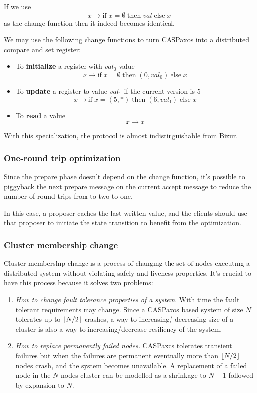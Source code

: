 \documentclass[12pt]{article}
\theoremstyle{definition}
\DeclarePairedDelimiter{\floor}{\lfloor}{\rfloor}
\begin{document}
If we use
$$x \to \mbox{if}\; x = \emptyset \;\mbox{then}\; val\; \mbox{else}\; x$$
as the change function then it indeed becomes identical.

We may use the following change functions to turn CASPaxos into a distributed compare and set register:
\begin{itemize}
  \item To {\bf initialize} a register with $val_0$ value
  $$x \to \mbox{if}\; x = \emptyset \;\mbox{then}\; (0, val_0)\; \mbox{else}\; x$$
  
  \item To {\bf update} a register to value $val_1$ if the current version is $5$
  $$x \to \mbox{if}\; x = (5, \ast) \;\mbox{then}\; (6, val_1)\; \mbox{else}\; x$$
  
  \item To {\bf read} a value
  $$x \to x$$
\end{itemize}

With this specialization, the protocol is almost indistinguishable from Bizur\cite{bizur}.

\subsubsection{One-round trip optimization}

Since the prepare phase doesn't depend on the change function, it's possible to piggyback the next prepare message on the current accept message to reduce the number of round trips from to two to one.

In this case, a proposer caches the last written value, and the clients should use that proposer to initiate the state transition to benefit from the optimization.

\subsubsection{Cluster membership change}

Cluster membership change is a process of changing the set of nodes executing a distributed system without violating safely and liveness properties. It's crucial to have this process because it solves two problems:

\begin{enumerate}
  \item {\it How to change fault tolerance properties of a system}. With time the fault tolerant requirements may change. Since a CASPaxos based system of size $N$ tolerates up to $\floor{N/2}$ crashes, a way to increasing/ decreasing size of a cluster is also a way to increasing/decrease resiliency of the system.

  \item {\it How to replace permanently failed nodes.} CASPaxos tolerates transient failures but when the failures are permanent eventually more than $\floor{N/2}$ nodes crash, and the system becomes unavailable. A replacement of a failed node in the $N$ nodes cluster can be modelled as a shrinkage to $N-1$ followed by expansion to $N$.
\end{enumerate}
\end{document}
